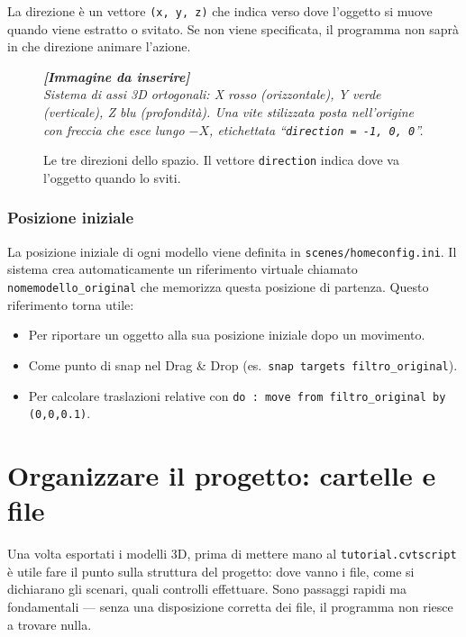 ﻿\documentclass[a4paper,12pt,oneside]{book}
\newcommand{\kw}[1]{\texttt{\color{keycolor}#1}}
\newcommand{\file}[1]{\texttt{#1}}
\newcommand{\imgph}[2]{%
  \begin{tcolorbox}[colback=cvtlightblue!30,colframe=cvtblue!40,%
    width=#1,halign=center,valign=center,height=5cm,boxrule=0.5pt,arc=3pt]%
    \textcolor{cvtgray}{\itshape\footnotesize\textbf{[Immagine da inserire]}\\[3pt]#2}%
  \end{tcolorbox}}
\begin{document}
\begin{notablu}[Ricorda]
La direzione è un vettore \texttt{(x,~y,~z)} che indica verso dove
l'oggetto si muove quando viene estratto o svitato. Se non viene
specificata, il programma non saprà in che direzione animare l'azione.
\end{notablu}

\begin{figure}[H]
  \centering
  \imgph{10cm}{Sistema di assi 3D ortogonali: X rosso (orizzontale), Y verde (verticale), Z blu (profondità). Una vite stilizzata posta nell'origine con freccia che esce lungo $-X$, etichettata ``\texttt{direction = -1, 0, 0}''.}
  \caption{Le tre direzioni dello spazio. Il vettore \texttt{direction} indica dove va l'oggetto quando lo sviti.}
  \label{fig:sistema-xyz}
\end{figure}

\subsection{Posizione iniziale}

La posizione iniziale di ogni modello viene definita in
\file{scenes/homeconfig.ini}. Il sistema crea automaticamente un
riferimento virtuale chiamato \texttt{nomemodello\_original} che
memorizza questa posizione di partenza. Questo riferimento torna utile:

\begin{itemize}
  \item Per riportare un oggetto alla sua posizione iniziale dopo un
        movimento.
  \item Come punto di snap nel Drag \& Drop
        (es.\ \texttt{snap targets filtro\_original}).
  \item Per calcolare traslazioni relative con
        \kw{do : move from filtro\_original by (0,0,0.1)}.
\end{itemize}

\chapter{Organizzare il progetto: cartelle e file}
\label{ch:progetto}

Una volta esportati i modelli 3D, prima di mettere mano al
\file{tutorial.cvtscript} è utile fare il punto sulla struttura del
progetto: dove vanno i file, come si dichiarano gli scenari, quali
controlli effettuare. Sono passaggi rapidi ma fondamentali --- senza una
disposizione corretta dei file, il programma non riesce a trovare nulla.
\end{document}
